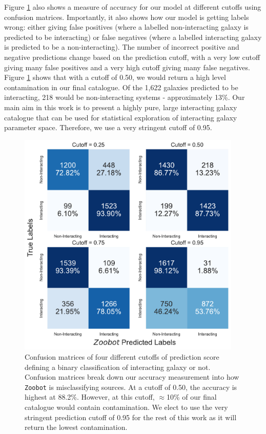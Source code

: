 Figure \ref{fig:conf-mat} also shows a measure of accuracy for our model at different cutoffs using confusion matrices. Importantly, it also shows how our model is getting labels wrong: either giving false positives (where a labelled non-interacting galaxy is predicted to be interacting) or false negatives (where a labelled interacting galaxy is predicted to be a non-interacting). The number of incorrect positive and negative predictions change based on the prediction cutoff, with a very low cutoff giving many false positives and a very high cutoff giving many false negatives. Figure \ref{fig:conf-mat} shows that with a cutoff of 0.50, we would return a high level contamination in our final catalogue. Of the 1,622 galaxies predicted to be interacting, 218 would be non-interacting systems - approximately 13\%. Our main aim in this work is to present a highly pure, large interacting galaxy catalogue that can be used for statistical exploration of interacting galaxy parameter space. Therefore, we use a very stringent cutoff of 0.95.

\begin{figure}
  \centering
  \includegraphics[width=0.95\textwidth]{Chapter2/figures/fig5.pdf}
  \caption[Confusion matrices of four different cutoffs of prediction score defining a binary classification of interacting galaxy or not.]{Confusion matrices of four different cutoffs of prediction score defining a binary classification of interacting galaxy or not. Confusion matrices break down our accuracy measurement into how \texttt{Zoobot} is misclassifying sources. At a cutoff of 0.50, the accuracy is highest at 88.2\%. However, at this cutoff, $\approx$10\% of our final catalogue would contain contamination. We elect to use the very stringent prediction cutoff of 0.95 for the rest of this work as it will return the lowest contamination.}
  \label{fig:conf-mat}
\end{figure}

